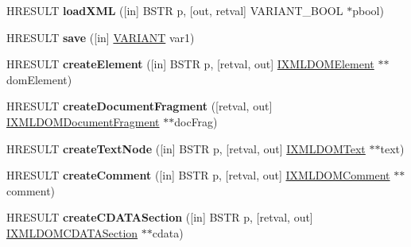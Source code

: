 \begin{DoxyCompactItemize}
H\+R\+E\+S\+U\+LT {\bfseries load\+X\+ML} (\mbox{[}in\mbox{]} B\+S\+TR p, \mbox{[}out, retval\mbox{]} V\+A\+R\+I\+A\+N\+T\+\_\+\+B\+O\+OL $\ast$pbool)
\item 
\mbox{\label{interface_m_s_x_m_l2_1_1_i_x_m_l_d_o_m_document_ab04b05bb7a06019c1ffd3f05be74ab3b}} 
H\+R\+E\+S\+U\+LT {\bfseries save} (\mbox{[}in\mbox{]} \hyperlink{structtag_v_a_r_i_a_n_t}{V\+A\+R\+I\+A\+NT} var1)
\item 
\mbox{\label{interface_m_s_x_m_l2_1_1_i_x_m_l_d_o_m_document_aa63b6edfa8b6bb4ab271d7db04da8f37}} 
H\+R\+E\+S\+U\+LT {\bfseries create\+Element} (\mbox{[}in\mbox{]} B\+S\+TR p, \mbox{[}retval, out\mbox{]} \hyperlink{interface_m_s_x_m_l2_1_1_i_x_m_l_d_o_m_element}{I\+X\+M\+L\+D\+O\+M\+Element} $\ast$$\ast$dom\+Element)
\item 
\mbox{\label{interface_m_s_x_m_l2_1_1_i_x_m_l_d_o_m_document_a083c503c47aa36f6414bed9f76138272}} 
H\+R\+E\+S\+U\+LT {\bfseries create\+Document\+Fragment} (\mbox{[}retval, out\mbox{]} \hyperlink{interface_m_s_x_m_l2_1_1_i_x_m_l_d_o_m_document_fragment}{I\+X\+M\+L\+D\+O\+M\+Document\+Fragment} $\ast$$\ast$doc\+Frag)
\item 
\mbox{\label{interface_m_s_x_m_l2_1_1_i_x_m_l_d_o_m_document_ac4424718d50e4d0721b1f1a271591a87}} 
H\+R\+E\+S\+U\+LT {\bfseries create\+Text\+Node} (\mbox{[}in\mbox{]} B\+S\+TR p, \mbox{[}retval, out\mbox{]} \hyperlink{interface_m_s_x_m_l2_1_1_i_x_m_l_d_o_m_text}{I\+X\+M\+L\+D\+O\+M\+Text} $\ast$$\ast$text)
\item 
\mbox{\label{interface_m_s_x_m_l2_1_1_i_x_m_l_d_o_m_document_ad999e03cc035339b43c70ee55877a536}} 
H\+R\+E\+S\+U\+LT {\bfseries create\+Comment} (\mbox{[}in\mbox{]} B\+S\+TR p, \mbox{[}retval, out\mbox{]} \hyperlink{interface_m_s_x_m_l2_1_1_i_x_m_l_d_o_m_comment}{I\+X\+M\+L\+D\+O\+M\+Comment} $\ast$$\ast$comment)
\item 
\mbox{\label{interface_m_s_x_m_l2_1_1_i_x_m_l_d_o_m_document_a4c3f3fd68e389ad8d831ea4e7c33e123}} 
H\+R\+E\+S\+U\+LT {\bfseries create\+C\+D\+A\+T\+A\+Section} (\mbox{[}in\mbox{]} B\+S\+TR p, \mbox{[}retval, out\mbox{]} \hyperlink{interface_m_s_x_m_l2_1_1_i_x_m_l_d_o_m_c_d_a_t_a_section}{I\+X\+M\+L\+D\+O\+M\+C\+D\+A\+T\+A\+Section} $\ast$$\ast$cdata)
$$
\end{DoxyCompactItemize}
